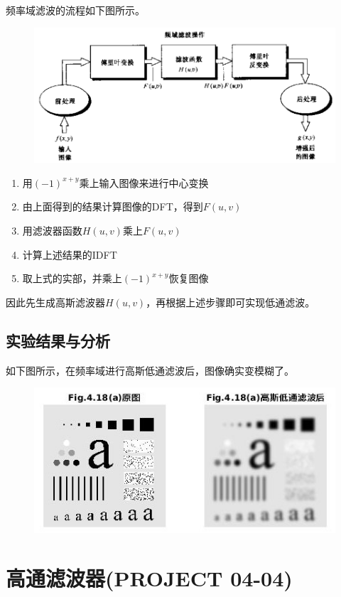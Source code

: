 \documentclass[logo,reportComp]{thesis}
\begin{document}
频率域滤波的流程如下图所示。
\begin{figure}[H]
\centering
\includegraphics[width=0.8\linewidth]{fig/process.png}
\end{figure}
\begin{enumerate}
    \item 用$(-1)^{x+y}$乘上输入图像来进行中心变换
    \item 由上面得到的结果计算图像的DFT，得到$F(u,v)$
    \item 用滤波器函数$H(u,v)$乘上$F(u,v)$
    \item 计算上述结果的IDFT
    \item 取上式的实部，并乘上$(-1)^{x+y}$恢复图像
\end{enumerate}
因此先生成高斯滤波器$H(u,v)$，再根据上述步骤即可实现低通滤波。

\subsection{实验结果与分析}
如下图所示，在频率域进行高斯低通滤波后，图像确实变模糊了。
\begin{figure}[H]
\centering
\includegraphics[width=0.8\linewidth]{fig/02.jpg}
\end{figure}


\section{高通滤波器(PROJECT 04-04)}
\end{document}
